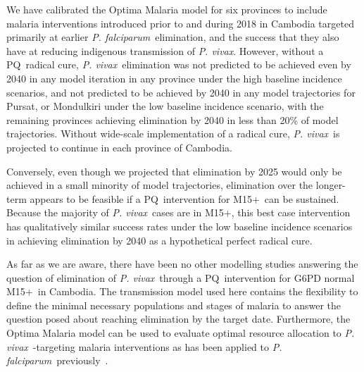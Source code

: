 \documentclass[doublespacing]{bmcart}
\newcommand{\pv}{\textit{P. vivax}}
\newcommand{\pf}{\textit{P. falciparum}}
\newcommand{\males}{M15$+$}
\newcommand{\pq}{PQ}
\begin{document}
We have calibrated the Optima Malaria model for six provinces to include malaria interventions introduced prior to and during 2018 in Cambodia targeted primarily at earlier \pf~elimination, and the success that they also have at reducing indigenous transmission of \pv. However, without a \pq~radical cure, \pv~elimination was not predicted to be achieved even by 2040 in any model iteration in any province under the high baseline incidence scenarios, and not predicted to be achieved by 2040 in any model trajectories for Pursat, or Mondulkiri under the low baseline incidence scenario, with the remaining provinces achieving elimination by 2040 in less than 20\% of model trajectories. Without wide-scale implementation of a radical cure, \pv~is projected to continue in each province of Cambodia.

Conversely, even though we projected that elimination by 2025 would only be achieved in a small minority of model trajectories, elimination over the longer-term appears to be feasible if a \pq~intervention for \males~can be sustained. Because the majority of \pv~cases are in \males, this best case intervention has qualitatively similar success rates under the low baseline incidence scenarios in achieving elimination by 2040 as a hypothetical perfect radical cure.




As far as we are aware, there have been no other modelling studies answering the question of elimination of \pv~through a \pq~intervention for G6PD normal \males~in Cambodia. The transmission model used here contains the flexibility to define the minimal necessary populations and stages of malaria to answer the question posed about reaching elimination by the target date. Furthermore, the Optima Malaria model can be used to evaluate optimal resource allocation to \pv~-targeting malaria interventions as has been applied to \pf~previously~\cite{scott2017}.
\end{document}
